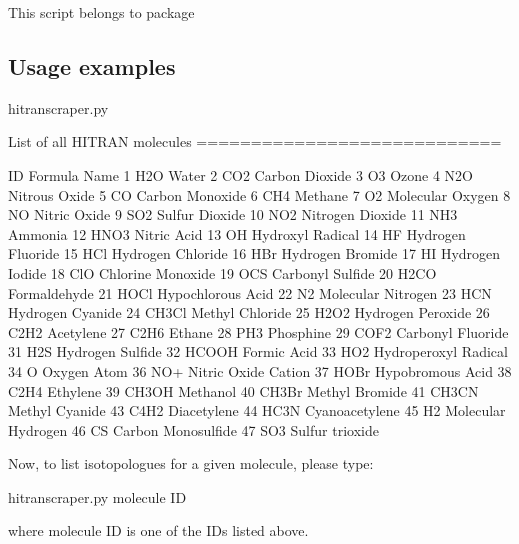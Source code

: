 \documentclass[letterpaper,10pt,english]{sphinxmanual}
\begin{document}
This script belongs to package 


\subsection{Usage examples}
\label{\detokenize{autoscripts/script-hitran-scraper:usage-examples}}
\begin{sphinxVerbatim}[commandchars=\\\{\}]
\PYGZdl{} hitran\PYGZhy{}scraper.py

List of all HITRAN molecules
============================

  ID  Formula    Name
\PYGZhy{}\PYGZhy{}\PYGZhy{}\PYGZhy{}  \PYGZhy{}\PYGZhy{}\PYGZhy{}\PYGZhy{}\PYGZhy{}\PYGZhy{}\PYGZhy{}\PYGZhy{}\PYGZhy{}  \PYGZhy{}\PYGZhy{}\PYGZhy{}\PYGZhy{}\PYGZhy{}\PYGZhy{}\PYGZhy{}\PYGZhy{}\PYGZhy{}\PYGZhy{}\PYGZhy{}\PYGZhy{}\PYGZhy{}\PYGZhy{}\PYGZhy{}\PYGZhy{}\PYGZhy{}\PYGZhy{}\PYGZhy{}\PYGZhy{}
   1  H2O        Water
   2  CO2        Carbon Dioxide
   3  O3         Ozone
   4  N2O        Nitrous Oxide
   5  CO         Carbon Monoxide
   6  CH4        Methane
   7  O2         Molecular Oxygen
   8  NO         Nitric Oxide
   9  SO2        Sulfur Dioxide
  10  NO2        Nitrogen Dioxide
  11  NH3        Ammonia
  12  HNO3       Nitric Acid
  13  OH         Hydroxyl Radical
  14  HF         Hydrogen Fluoride
  15  HCl        Hydrogen Chloride
  16  HBr        Hydrogen Bromide
  17  HI         Hydrogen Iodide
  18  ClO        Chlorine Monoxide
  19  OCS        Carbonyl Sulfide
  20  H2CO       Formaldehyde
  21  HOCl       Hypochlorous Acid
  22  N2         Molecular Nitrogen
  23  HCN        Hydrogen Cyanide
  24  CH3Cl      Methyl Chloride
  25  H2O2       Hydrogen Peroxide
  26  C2H2       Acetylene
  27  C2H6       Ethane
  28  PH3        Phosphine
  29  COF2       Carbonyl Fluoride
  31  H2S        Hydrogen Sulfide
  32  HCOOH      Formic Acid
  33  HO2        Hydroperoxyl Radical
  34  O          Oxygen Atom
  36  NO+        Nitric Oxide Cation
  37  HOBr       Hypobromous Acid
  38  C2H4       Ethylene
  39  CH3OH      Methanol
  40  CH3Br      Methyl Bromide
  41  CH3CN      Methyl Cyanide
  43  C4H2       Diacetylene
  44  HC3N       Cyanoacetylene
  45  H2         Molecular Hydrogen
  46  CS         Carbon Monosulfide
  47  SO3        Sulfur trioxide

Now, to list isotopologues for a given molecule, please type:

    hitran\PYGZhy{}scraper.py \PYGZlt{}molecule ID\PYGZgt{}

where \PYGZlt{}molecule ID\PYGZgt{} is one of the IDs listed above.
\end{sphinxVerbatim}
\end{document}
